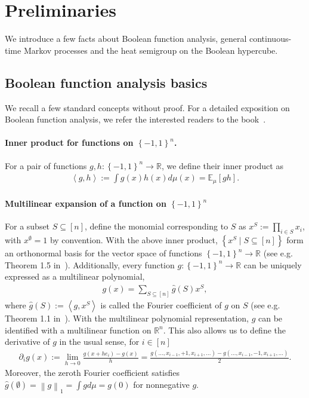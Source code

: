 \documentclass[11pt]{article}
\theoremstyle{named}
\theoremstyle{plain}
\newcommand{\defn}{:=}
\newcommand{\real}{\ensuremath{\mathbb{R}}}
\newcommand{\Exs}{\ensuremath{{\mathbb{E}}}}
\newcommand{\braces}[1]{\left\{ #1 \right \}}
\newcommand{\angles}[1]{\left\langle #1 \right \rangle}
\newcommand{\vecnorm}[2]{\left\| #1\right\|_{#2}}
\begin{document}
\section{Preliminaries}
We introduce a few facts about Boolean function analysis, general continuous-time Markov processes and the heat semigroup on the Boolean hypercube.

\subsection{Boolean function analysis basics}
We recall a few standard concepts without proof. For a detailed exposition on Boolean function analysis, we refer the interested readers to the book~\cite{o2014analysis}. 

\paragraph{Inner product for functions on $\braces{-1,1}^n$.} For a pair of functions $g, h: \braces{-1,1}^n \to \real$, we define their inner product as
\begin{align*}
  \angles{g, h} \defn \int g(x) h(x) d\mu(x) = \Exs_\mu[g h ]. 
\end{align*}

\paragraph{Multilinear expansion of a function on $\braces{-1,1}^n$} For a subset $S \subseteq [n]$, define the monomial corresponding to $S$ as $
  x^S \defn \prod_{i \in S} x_i$, 
with $x^{\emptyset} = 1$ by convention. With the above inner product, $\braces{x^S \mid S \subseteq [n]}$ form an orthonormal basis for the vector space of functions $\braces{-1, 1}^n \to \real$ (see e.g. Theorem 1.5 in~\cite{o2014analysis}). Additionally, every function $g: \braces{-1,1}^n\to \real$ can be uniquely expressed as a multilinear polynomial, 
\begin{align}
  \label{eq:multilinear_expansion}
  g(x) = \sum_{S \subseteq [n]} \widehat{g}(S) x^S,
\end{align} 
where $\widehat{g}(S) \defn \angles{g, x^S}$ is called the Fourier coefficient of $g$ on $S$ (see e.g. Theorem 1.1 in~\cite{o2014analysis}). With the multilinear polynomial representation, $g$ can be identified with a multilinear function on $\real^n$. This also allows us to define the derivative of $g$ in the usual sense, for $i \in [n]$
\begin{align*}
  \partial_i g(x) \defn \lim_{h \to 0}\frac{g(x+h e_i) - g(x)}{h} = \frac{g(\ldots, x_{i-1}, +1, x_{i+1}, \ldots) - g(\ldots, x_{i-1}, -1, x_{i+1}, \ldots)}{2}. 
\end{align*}
Moreover, the zeroth Fourier coefficient satisfies $\hat{g}(\emptyset) = \vecnorm{g}{1} = \int g d\mu = g(0)$ for nonnegative $g$. 
\end{document}
